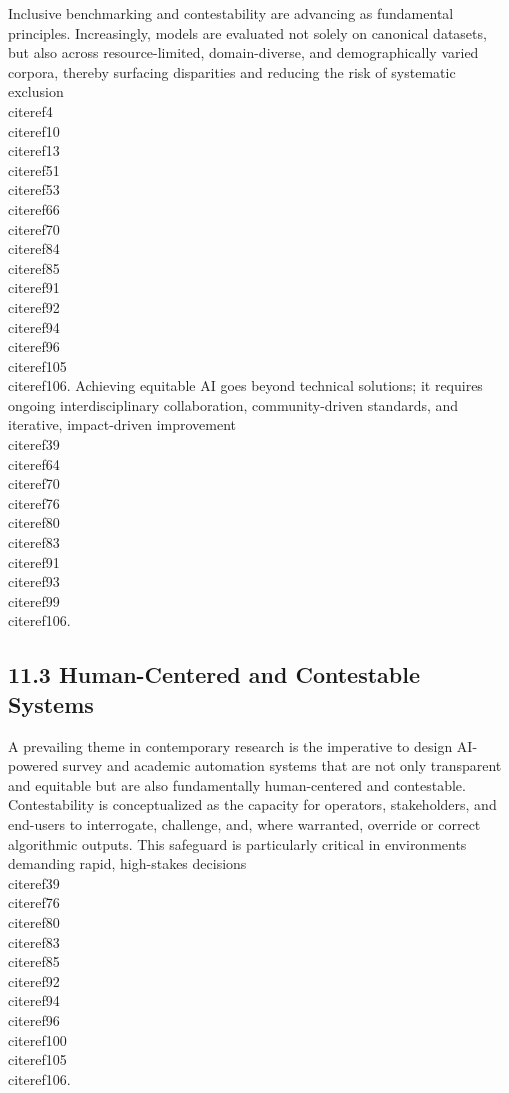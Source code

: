 \documentclass[11pt]{article}
\begin{document}
Inclusive benchmarking and contestability are advancing as fundamental principles. Increasingly, models are evaluated not solely on canonical datasets, but also across resource-limited, domain-diverse, and demographically varied corpora, thereby surfacing disparities and reducing the risk of systematic exclusion \\cite{ref4}\\cite{ref10}\\cite{ref13}\\cite{ref51}\\cite{ref53}\\cite{ref66}\\cite{ref70}\\cite{ref84}\\cite{ref85}\\cite{ref91}\\cite{ref92}\\cite{ref94}\\cite{ref96}\\cite{ref105}\\cite{ref106}. Achieving equitable AI goes beyond technical solutions; it requires ongoing interdisciplinary collaboration, community-driven standards, and iterative, impact-driven improvement \\cite{ref39}\\cite{ref64}\\cite{ref70}\\cite{ref76}\\cite{ref80}\\cite{ref83}\\cite{ref91}\\cite{ref93}\\cite{ref99}\\cite{ref106}.

\subsection{11.3 Human-Centered and Contestable Systems}

A prevailing theme in contemporary research is the imperative to design AI-powered survey and academic automation systems that are not only transparent and equitable but are also fundamentally human-centered and contestable. Contestability is conceptualized as the capacity for operators, stakeholders, and end-users to interrogate, challenge, and, where warranted, override or correct algorithmic outputs. This safeguard is particularly critical in environments demanding rapid, high-stakes decisions \\cite{ref39}\\cite{ref76}\\cite{ref80}\\cite{ref83}\\cite{ref85}\\cite{ref92}\\cite{ref94}\\cite{ref96}\\cite{ref100}\\cite{ref105}\\cite{ref106}.
\end{document}
